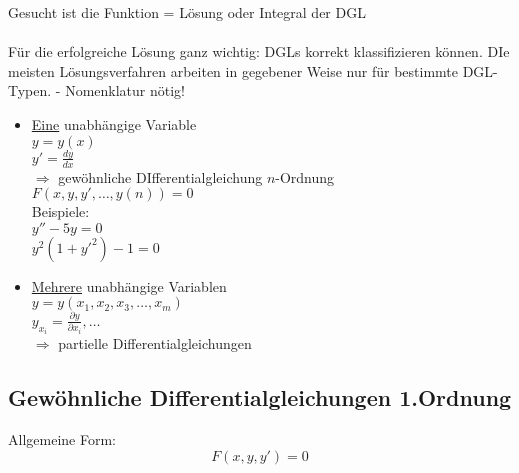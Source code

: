 \documentclass{article}
\begin{document}
Gesucht ist die Funktion = Lösung oder Integral der DGL\\\\Für die erfolgreiche Lösung ganz wichtig: DGLs korrekt klassifizieren können. DIe meisten Lösungsverfahren arbeiten in gegebener Weise nur für bestimmte DGL-Typen. - Nomenklatur nötig!\\
\begin{itemize}
    \item \underline{Eine} unabhängige Variable\\ $y=y(x)$\\$y' = \frac{dy}{dx}$\\ $\Rightarrow$ gewöhnliche DIfferentialgleichung $n$-Ordnung\\$F(x,y,y',\dots ,y(n)) = 0$\\ Beispiele:\\$y''-5y=0$\\$y^2(1+y'^2)-1=0$
    \item \underline{Mehrere} unabhängige Variablen\\$y=y(x_1,x_2,x_3,\dots ,x_m)$\\$y_{x_i} = \frac{\partial y}{\partial x_i},\dots$\\$\Rightarrow$ partielle Differentialgleichungen
\end{itemize}

\subsection{Gewöhnliche Differentialgleichungen 1.Ordnung}
Allgemeine Form:\\
\begin{equation*}
    F(x,y,y') = 0
\end{equation*}
\end{document}
